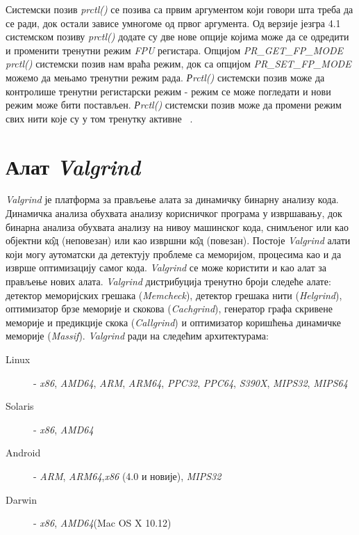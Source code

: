 \documentclass[12pt,oneside]{memoir}
\begin{document}
\indent Системски позив \textit{prctl()} се позива са првим аргументом који говори шта треба да се ради, док остали зависе умногоме од првог аргумента. Од верзије језгра 4.1 системском позиву \textit{prctl()} додате су две нове опције којима може да се одредити и променити тренутни режим \textit{FPU} регистара.  Опцијом \textit{PR\_GET\_FP\-\_MODE} \textit{prctl()} системски позив нам враћа режим, док са опцијом \textit{PR\_SET\_FP\-\_MODE} можемо да мењамо тренутни режим рада. \textit{Рrctl()} системски позив може да контролише тренутни регистарски режим - режим се може погледати и нови режим може бити постављен. \textit{Рrctl()} системски позив може да промени режим свих нити које су у том тренутку активне ~\cite{prctlRef}.


\chapter{Алат \textit{Valgrind}}
\label{chp:valgrind}

\indent \textit{Valgrind} је платформа за прављење алата за динамичку бинарну анализу кода. Динамичка анализа обухвата анализу корисничког програма у извршавању, док бинарна анализа обухвата анализу на нивоу машинског кода, снимљеног или као објектни к\^{о}д (неповезан) или као извршни к\^{о}д (повезан). Постоје \textit{Valgrind} алати који могу аутоматски да детектују проблеме са меморијом, процесима као и да изврше оптимизацију самог кода. \textit{Valgrind} се може користити и као алат за прављење нових алата. \textit{Valgrind} дистрибуција тренутно броји следеће алате: детектор меморијских грешака (\textit{Memcheck}), детектор грешака нити (\textit{Helgrind}), оптимизатор брзе меморије и скокова (\textit{Cachgrind}), генератор графа скривене меморије и предикције скока (\textit{Callgrind}) и оптимизатор коришћења динамичке меморије (\textit{Massif}). \textit{Valgrind} ради на следећим архитектурама:
\begin{description}
	\item[Linux] - \textit{x86}, \textit{AMD64}, \textit{ARM}, \textit{ARM64}, \textit{PPC32}, \textit{PPC64}, \textit{S390X}, \textit{MIPS32}, \textit{MIPS64}
	\item[Solaris] - \textit{x86}, \textit{AMD64}
	\item[Android] - \textit{ARM}, \textit{ARM64},\textit{x86} (4.0 и новије), \textit{MIPS32}
	\item[Darwin] - \textit{x86}, \textit{AMD64}(Mac OS X 10.12)
\end{description}
\end{document}
